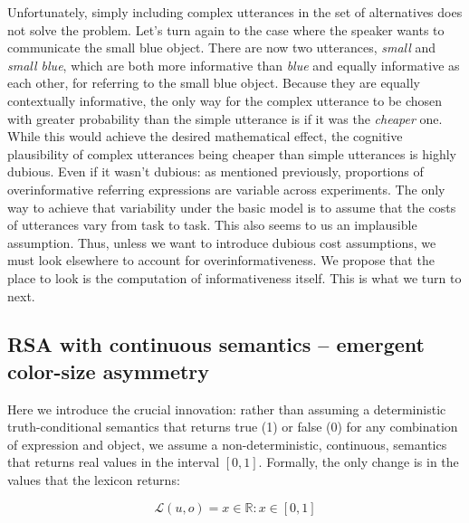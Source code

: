 \documentclass[11pt]{article}
\begin{document}
Unfortunately, simply including complex utterances in the set of alternatives does not solve the problem. Let's turn again to the case where the speaker wants to communicate the small blue object. There are now two  utterances, \emph{small} and \emph{small blue}, which are both more informative than \emph{blue} and equally informative as each other, for referring to the small blue object. Because they are equally contextually informative, the only way for the complex utterance to be chosen with greater probability than the simple utterance is if it was the \emph{cheaper} one. While this would achieve the desired mathematical effect, the cognitive plausibility of complex utterances being cheaper than simple utterances is highly dubious. Even if it wasn't dubious: as  mentioned previously,  proportions of overinformative referring expressions are variable across experiments. The only way to achieve that variability under the basic model is to assume that the costs of utterances vary from task to task. This also seems to us an implausible assumption. Thus, unless we want to introduce dubious cost assumptions, we must look elsewhere to account for overinformativeness. We propose that the place to look is the computation of informativeness itself. This is what we turn to next.

\subsection{RSA with continuous semantics -- emergent color-size asymmetry}
\label{sec:modifiedmodel}

Here we introduce the crucial innovation: rather than assuming a deterministic truth-conditional semantics that returns true (1) or false (0) for any combination of expression and object, we assume a non-deterministic, continuous, semantics that returns real values in the interval $[0,1]$. Formally, the only change is in the values that the lexicon returns:

\begin{equation}
\mathcal{L}(u,o) = x \in \mathbb{R} : x \in [0, 1]
\end{equation}
\end{document}
